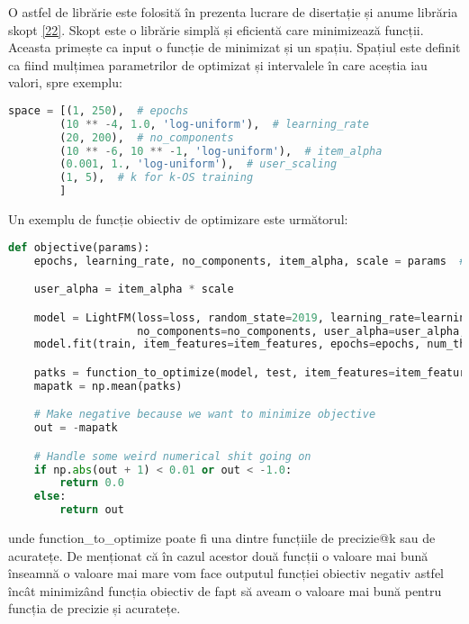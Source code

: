 O astfel de librărie este folosită în prezenta lucrare de disertație și anume librăria skopt \hyperlink{skopt}{[22]}. Skopt este o librărie simplă și eficientă care minimizează funcții. Aceasta primește ca input o funcție de minimizat și un spațiu. Spațiul este definit ca fiind mulțimea parametrilor de optimizat și intervalele în care aceștia iau valori, spre exemplu:
\begin{lstlisting}[language=Python, caption=Spațiul parametrilor de optimizat]
space = [(1, 250),  # epochs
        (10 ** -4, 1.0, 'log-uniform'),  # learning_rate
        (20, 200),  # no_components
        (10 ** -6, 10 ** -1, 'log-uniform'),  # item_alpha
        (0.001, 1., 'log-uniform'),  # user_scaling
        (1, 5),  # k for k-OS training
        ] 
\end{lstlisting}

Un exemplu de funcție obiectiv de optimizare este următorul:
\begin{lstlisting}[language=Python, caption=Funcția obiectiv]
def objective(params):
    epochs, learning_rate, no_components, item_alpha, scale = params  # 'k_os'

    user_alpha = item_alpha * scale

    model = LightFM(loss=loss, random_state=2019, learning_rate=learning_rate,
                    no_components=no_components, user_alpha=user_alpha, item_alpha=item_alpha)
    model.fit(train, item_features=item_features, epochs=epochs, num_threads=threads, verbose=True)

    patks = function_to_optimize(model, test, item_features=item_features, num_threads=threads)
    mapatk = np.mean(patks)

    # Make negative because we want to minimize objective
    out = -mapatk

    # Handle some weird numerical shit going on
    if np.abs(out + 1) < 0.01 or out < -1.0:
        return 0.0
    else:
        return out
\end{lstlisting}
unde function\_to\_optimize poate fi una dintre funcțiile de precizie@k sau de acuratețe. De menționat că în cazul acestor două funcții o valoare mai bună înseamnă o valoare mai mare vom face outputul funcției obiectiv negativ astfel încât minimizând funcția obiectiv de fapt să aveam o valoare mai bună pentru funcția de precizie și acuratețe.

